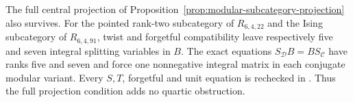 The full central projection of
Proposition~\ref{prop:modular-subcategory-projection} also survives.
For the pointed rank-two subcategory of $R_{6,4,22}$ and the Ising
subcategory of $R_{6,4,91}$, twist and forgetful compatibility leave
respectively five and seven integral splitting variables in $B$.
The exact equations $S_{\mathcal D}B=BS_{\mathcal C}$ have ranks five
and seven and force one nonnegative integral matrix in each conjugate
modular variant. Every $S,T$, forgetful and unit equation is rechecked
in .
Thus the full projection condition adds no quartic obstruction.
